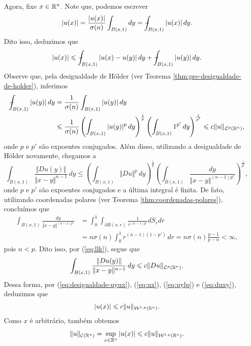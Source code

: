 \begin{prf}
    Agora, fixe $x \in \mathbb{R}^n$. Note que, podemos escrever
    \[
        |u(x)| = \frac{|u(x)|}{\sigma(n)}\int_{B(x,1)} dy = -\!\!\!\!\!\!\int_{B(x,1)} |u(x)| \,dy.
    \]
    Dito isso, deduzimos que
    \begin{equation} \label{eq:ux}
        |u(x)| \leqslant \sint_{B(x,1)} |u(x) - u(y)| \,dy + \sint_{B(x,1)} |u(y)|\,dy.
    \end{equation}
    Observe que, pela desigualdade de Hölder (ver Teorema \ref{thm:pre-desigualdade-de-holder}), inferimos
    \begin{equation} \label{eq:uylp}
        \begin{aligned}
            -\!\!\!\!\!\!\int_{B(x,1)} |u(y)| \,dy &= \frac{1}{\sigma(n)} \int_{B(x,1)} |u(y)| \,dy\\ 
            &\leqslant \frac{1}{\sigma(n)} \left( \int_{B(x,1)} |u(y)|^p\,dy \right)^{\frac{1}{p}} \left( \int_{B(x,1)} 1^{p'} \,dy \right)^{\frac{1}{p'}} \leqslant c \Vert u \Vert_{\mathcal{L}^p(\mathbb{R}^n)},
        \end{aligned}
    \end{equation}
    onde $p$ e $p'$ são expoentes conjugados.
    Além disso, utilizando a desigualdade de Hölder novamente, chegamos a
    \begin{equation} \label{eq:llk}
        \int_{B(x,1)} \frac{\Vert Du(y) \Vert}{\Vert x - y \Vert^{n-1}} \,dy \leqslant \left( \int_{B(x,1)} \Vert Du \Vert^p \,dy \right)^{\frac{1}{p}} \left( \int_{B(x,1)} \frac{dy}{\Vert x - y \Vert^{(n-1)p'}} \right)^{\frac{1}{p'}},
    \end{equation}
    onde $p$ e $p'$ são expoentes conjugados e a última integral é finita.
    De fato, utilizando coordenadas polares (ver Teorema \ref{thm:coordenadas-polares}), concluímos que
    \[
        \begin{aligned}
            \int_{B(x,1)} \frac{dy}{\Vert x - y \Vert^{(n-1)p'}} &= \int_0^1 \int_{\partial B(x,r)} \frac{1}{r^{(n-1)p'}} dS_rdr\\
            &= n\sigma(n)\int_0^1 r^{(n-1)(1-p')} \,dr = n \sigma(n)  \frac{p-1}{p-n} < \infty,
        \end{aligned}
    \]
    pois $n < p$.
    Dito isso, por (\ref{eq:llk}), segue que
    \begin{equation} \label{eq:duxy}
        \int_{B(x,1)} \frac{\Vert Du(y) \Vert}{\Vert x - y \Vert^{n-1}} \,dy \leqslant c\Vert Du \Vert_{\mathcal{L}^p(\mathbb{R}^n)}.
    \end{equation}
    Dessa forma, por (\ref{eq:desigualdade-uyux}), (\ref{eq:ux}), (\ref{eq:uylp}) e (\ref{eq:duxy}), deduzimos que
    \[
        |u(x)| \leqslant c \Vert u \Vert_{\mathcal{W}^{1,p}(\mathbb{R}^n)}.
    \]
    Como $x$ é arbitrário, também obtemos
    \begin{equation} \label{eq:normac}
        \Vert u \Vert_{\mathcal{C}(\mathbb{R}^n)} = \sup_{x \in \mathbb{R}^n} |u(x)| \leqslant c \Vert u \Vert_{\mathcal{W}^{1,p}(\mathbb{R}^n)}.
    \end{equation}


\end{prf}
